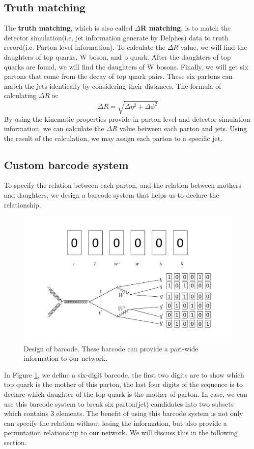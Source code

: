 \subsection{Truth matching}\label{subsec:Truth matching}
The \textbf{truth matching}, which is also called \textbf{$\Delta$R matching},  is to match the detector simulation(i.e. jet information generate by Delphes) data to truth record(i.e. Parton level information).  To calculate the $\Delta R$ value, we will find the daughters of top quarks, W boson, and b quark. After the daughters of top quarks are found, we will find the daughters of W bosons. Finally, we will get six partons that come from the decay of top quark pairs. These six partons can match the jets identically by considering their distances. The formula of calculating $\Delta R$ is:
\\
\begin{equation}
	\Delta R = \sqrt{\Delta\eta^{2} + \Delta\phi^{2}}
\end{equation}
By using the kinematic properties provide in parton level and detector simulation information, we can calculate the $\Delta R$ value between each parton and jets. Using the result of the calculation, we may assign each parton to a specific jet. 
\\
\subsection{Custom barcode system}\label{subsec:barcode}
To specify the relation between each parton, and the relation between mothers and daughters, we design a barcode system that helps us to declare the relationship.
\begin{figure}[H]
	\centering
	\includegraphics[width=1.1\linewidth]{Figures/barcode.pdf}
	\caption{Design of barcode. These barcode can provide a pari-wide information to our network.}
	\label{fig:barcode}
\end{figure}
\newpage
In Figure \ref{fig:barcode}, we define a six-digit barcode, the first two digits are to show which top quark is the mother of this parton, the last four digits of the sequence is to declare which daughter of the top quark is the mother of parton. In case, we can use this barcode system to break six parton(jet) candidates into two subsets which contains 3 elements. The benefit of using this barcode system is not only can specify the relation without losing the information, but also provide a permutation relationship to our network. We will discuss this in the following section.
